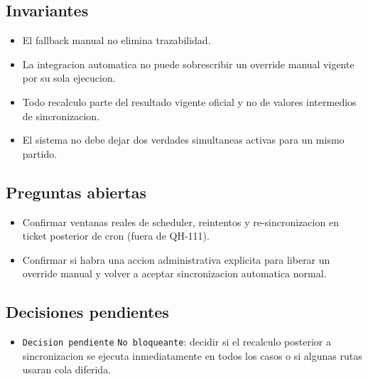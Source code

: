 \subsection{Invariantes}

\begin{itemize}
  \item El fallback manual no elimina trazabilidad.
  \item La integracion automatica no puede sobrescribir un override manual vigente por su sola ejecucion.
  \item Todo recalculo parte del resultado vigente oficial y no de valores intermedios de sincronizacion.
  \item El sistema no debe dejar dos verdades simultaneas activas para un mismo partido.
\end{itemize}

\subsection{Preguntas abiertas}

\begin{itemize}
  \item Confirmar ventanas reales de scheduler, reintentos y re-sincronizacion en ticket posterior de cron (fuera de QH-111).
  \item Confirmar si habra una accion administrativa explicita para liberar un override manual y volver a aceptar sincronizacion automatica normal.
\end{itemize}

\subsection{Decisiones pendientes}

\begin{itemize}
  \item \texttt{Decision pendiente} \texttt{No bloqueante}: decidir si el recalculo posterior a sincronizacion se ejecuta inmediatamente en todos los casos o si algunas rutas usaran cola diferida.
\end{itemize}
